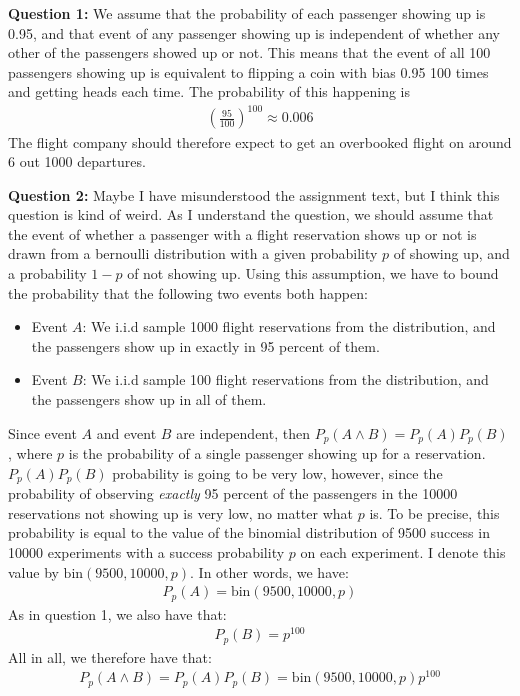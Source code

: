 \textbf{Question 1:} We assume that the probability of each passenger showing up is 0.95, and that event of any passenger showing up is independent of whether any other of the passengers showed up or not. This means that the event of all 100 passengers showing up is equivalent to flipping a coin with bias 0.95 100 times and getting heads each time. The probability of this happening is 
\begin{align}
\left( \frac{95}{100} \right)^{100} \approx 0.006	
\end{align}
The flight company should therefore expect to get an overbooked flight on around 6 out 1000 departures.

\textbf{Question 2:} Maybe I have misunderstood the assignment text, but I think this question is kind of weird. As I understand the question, we should assume that the event of whether a passenger with a flight reservation shows up or not is drawn from a bernoulli distribution with a given probability $p$ of showing up, and a probability $1-p$ of not showing up. Using this assumption, we have to bound the probability that the following two events both happen: 
\begin{itemize}
\item Event $A$: We i.i.d sample 1000 flight reservations from the distribution, and the passengers show up in exactly in 95 percent of them.
\item Event $B$: We i.i.d sample 100 flight reservations from the distribution, and the passengers show up in all of them.
\end{itemize}
Since event $A$ and event $B$ are independent, then $P_p(A \land B) = P_p(A)P_p(B)$, where $p$ is the probability of a single passenger showing up for a reservation. $P_p(A)P_p(B)$ probability is going to be very low, however, since the probability of observing \textit{exactly} 95 percent of the passengers in the 10000 reservations not showing up is very low, no matter what $p$ is. To be precise, this probability is equal to the value of the binomial distribution of 9500 success in 10000 experiments with a success probability $p$ on each experiment. I denote this value by $\text{bin}(9500, 10000,p)$. In other words, we have:
\begin{align}
P_p(A) = \text{bin}(9500, 10000,p)
\end{align}
As in question 1, we also have that:
\begin{align}
P_p(B) = p^{100}
\end{align}
All in all, we therefore have that:
\begin{align}
P_p(A \land B) = P_p(A)P_p(B) = \text{bin}(9500, 10000,p) p^{100}
\end{align}
